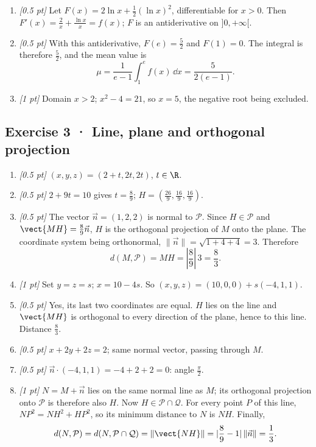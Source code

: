 \begin{enumerate}
\item \textit{[0.5 pt]} Let $F(x)=2\ln x+\frac12(\ln x)^2$, differentiable for $x>0$. Then $F'(x)=\frac{2}{x}+\frac{\ln x}{x}=f(x)$; $F$ is an antiderivative on $]0,+\infty[$.

\item \textit{[0.5 pt]} With this antiderivative, $F(e)=\frac{5}{2}$ and $F(1)=0$. The integral is therefore $\frac{5}{2}$, and the mean value is
\[\mu=\frac{1}{e-1}\int_1^e f(x)\,\dd x=\frac{5}{2(e-1)}.\]

\item \textit{[1 pt]} Domain $x>2$; $x^2-4=21$, so $x=5$, the negative root being excluded.

\end{enumerate}

\subsection*{Exercise 3 · Line, plane and orthogonal projection}\begin{enumerate}

\item \textit{[0.5 pt]} $(x,y,z)=(2+t,2t,2t)$, $t\in\R$.

\item \textit{[0.5 pt]} $2+9t=10$ gives $t=\frac{8}{9}$; $H=(\frac{26}{9},\frac{16}{9},\frac{16}{9})$.

\item \textit{[0.5 pt]} The vector $\vec n=(1,2,2)$ is normal to $\mathcal P$. Since $H\in\mathcal P$ and $\vect{MH}=\frac{8}{9}\vec n$, $H$ is the orthogonal projection of $M$ onto the plane. The coordinate system being orthonormal, $\|\vec n\|=\sqrt{1+4+4}=3$. Therefore
\[d(M,\mathcal P)=MH=|\frac{8}{9}|\,3=\frac{8}{3}.\]

\item \textit{[1 pt]} Set $y=z=s$; $x=10-4s$. So $(x,y,z)=(10,0,0)+s(-4,1,1)$.

\item \textit{[0.5 pt]} Yes, its last two coordinates are equal. $H$ lies on the line and $\vect{MH}$ is orthogonal to every direction of the plane, hence to this line. Distance $\frac{8}{3}$.

\item \textit{[0.5 pt]} $x+2y+2z=2$; same normal vector, passing through $M$.

\item \textit{[0.5 pt]} $\vec n\cdot(-4,1,1)=-4+2+2=0$: angle $\frac{\pi}{2}$.

\item \textit{[1 pt]} $N=M+\vec n$ lies on the same normal line as $M$; its orthogonal projection onto $\mathcal P$ is therefore also $H$. Now $H\in\mathcal P\cap\mathcal Q$. For every point $P$ of this line, $NP^2=NH^2+HP^2$, so its minimum distance to $N$ is $NH$. Finally,
\[d(N,\mathcal P)=d(N,\mathcal P\cap\mathcal Q)=\|\vect{NH}\|=|\frac{8}{9}-1|\,\|\vec n\|=\frac{1}{3}.\]

\end{enumerate}

